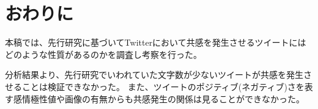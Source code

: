 \documentclass[dvipdfmx]{issj}
\begin{document}







\section{おわりに}  %

本稿では、先行研究に基づいてTwitterにおいて共感を発生させるツイートにはどのような性質があるのかを調査し考察を行った。

分析結果より、先行研究でいわれていた文字数が少ないツイートが共感を発生させることは検証できなかった。
また、ツイートのポジティブ(ネガティブ)さを表す感情極性値や画像の有無からも共感発生の関係は見ることができなかった。
\end{document}
